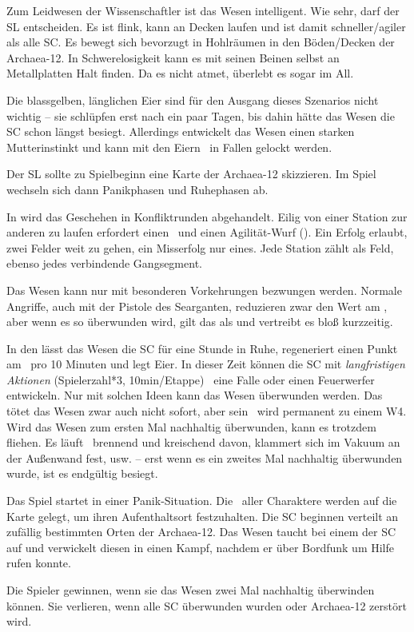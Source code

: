 {		Zum Leidwesen der Wissenschaftler ist das Wesen intelligent. Wie sehr, darf der SL entscheiden. Es ist flink, kann an Decken laufen und ist damit schneller/agiler als alle SC. Es bewegt sich bevorzugt in Hohlräumen in den Böden/Decken der Archaea-12. In Schwerelosigkeit kann es mit seinen Beinen selbst an Metallplatten Halt finden. Da es nicht atmet, überlebt es sogar im All.

		Die blassgelben, länglichen Eier sind für den Ausgang dieses Szenarios nicht wichtig -- sie schlüpfen erst nach ein paar Tagen, bis dahin hätte das Wesen die SC schon längst besiegt. Allerdings entwickelt das Wesen einen starken Mutterinstinkt und kann mit den Eiern \zB~in Fallen gelockt werden.


		\noindent
		Der SL sollte zu Spielbeginn eine Karte der Archaea-12 skizzieren. Im Spiel wechseln sich dann Panikphasen und Ruhephasen ab.

		In  wird das Geschehen in Konfliktrunden abgehandelt. Eilig von einer Station zur anderen zu laufen erfordert einen \AD~und einen Agilität-Wurf (). Ein Erfolg erlaubt, zwei Felder weit zu gehen, ein Misserfolg nur eines. Jede Station zählt als Feld, ebenso jedes verbindende Gangsegment.

		Das Wesen kann nur mit besonderen Vorkehrungen bezwungen werden. Normale Angriffe, auch mit der Pistole des Searganten, reduzieren zwar den Wert am \HD, aber wenn es so überwunden wird, gilt das als  und vertreibt es bloß kurzzeitig.

		In den  lässt das Wesen die SC für eine Stunde in Ruhe, regeneriert einen Punkt am \HD\ pro 10 Minuten und legt Eier. In dieser Zeit können die SC mit \emph{langfristigen Aktionen} (\TN Spielerzahl*3, 10min/Etappe) \zB\ eine Falle oder einen Feuerwerfer entwickeln. Nur mit solchen Ideen kann das Wesen  überwunden werden. Das tötet das Wesen zwar auch nicht sofort, aber sein \HD\ wird permanent zu einem W4. Wird das Wesen zum ersten Mal nachhaltig überwunden, kann es trotzdem fliehen. Es läuft \zB\ brennend und kreischend davon, klammert sich im Vakuum an der Außenwand fest, usw. -- erst wenn es ein zweites Mal nachhaltig überwunden wurde, ist es endgültig besiegt.

		Das Spiel startet in einer Panik-Situation. Die \HD\ aller Charaktere werden auf die Karte gelegt, um ihren Aufenthaltsort festzuhalten. Die SC beginnen verteilt an zufällig bestimmten Orten der Archaea-12. Das Wesen taucht bei einem der SC auf und verwickelt diesen in einen Kampf, nachdem er über Bordfunk um Hilfe rufen konnte.


		\noindent
		Die Spieler gewinnen, wenn sie das Wesen zwei Mal nachhaltig überwinden können. Sie verlieren, wenn alle SC überwunden wurden oder Archaea-12 zerstört wird.

}
